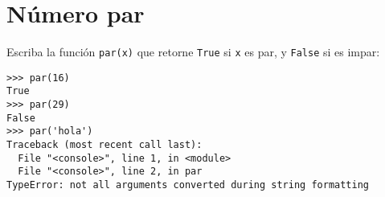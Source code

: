 \section{Número par}

Escriba la función \lstinline!par(x)! que retorne \lstinline!True! si
\lstinline!x! es par, y \lstinline!False! si es impar:

\begin{lstlisting}
>>> par(16)
True
>>> par(29)
False
>>> par('hola')
Traceback (most recent call last):
  File "<console>", line 1, in <module>
  File "<console>", line 2, in par
TypeError: not all arguments converted during string formatting
\end{lstlisting}

